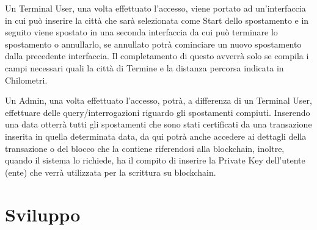 \documentclass[11pt,a4paper,titlepage]{report}
\begin{document}
Un Terminal User, una volta effettuato l'accesso, viene portato ad un'interfaccia in cui può inserire la città che sarà selezionata come Start dello spostamento e in seguito viene spostato in una seconda interfaccia da cui può terminare lo spostamento o annullarlo, se annullato potrà cominciare un nuovo spostamento dalla precedente interfaccia. Il completamento di questo avverrà solo se compila i campi necessari quali la città di Termine e la distanza percorsa indicata in Chilometri.

Un Admin, una volta effettuato l'accesso, potrà, a differenza di un Terminal User, effettuare delle query/interrogazioni riguardo gli spostamenti compiuti. Inserendo una data otterrà tutti gli spostamenti che sono stati certificati da una transazione inserita in quella determinata data, da qui potrà anche accedere ai dettagli della transazione o del blocco che la contiene riferendosi alla blockchain, inoltre, quando il sistema lo richiede, ha il compito di inserire la Private Key dell'utente (ente) che verrà utilizzata per la scrittura su blockchain.

\chapter{Sviluppo}
\end{document}
